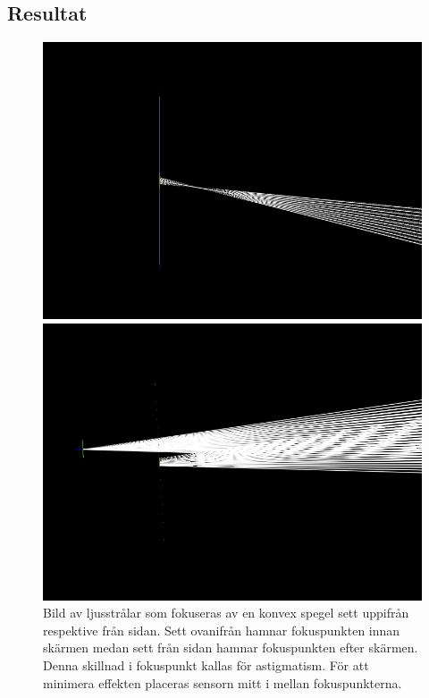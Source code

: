 \documentclass[a4paper]{article}
\begin{document}
\subsection{Resultat}

\FloatBarrier

\begin{figure}[h]
	\centering
	\begin{minipage}[b]{0.4\textwidth}
		\includegraphics[width=\textwidth]{Data/FRED/FRED1.jpg}
	\end{minipage}
	\hspace{10pt}
	\begin{minipage}[b]{0.4\textwidth}
		\includegraphics[width=\textwidth]{Data/FRED/FRED2.jpg}
	\end{minipage}
	\caption{Bild av ljusstrålar som fokuseras av en konvex spegel sett uppifrån respektive från sidan. Sett ovanifrån hamnar fokuspunkten innan skärmen medan sett från sidan hamnar fokuspunkten efter skärmen. Denna skillnad i fokuspunkt kallas för astigmatism. För att minimera effekten placeras sensorn mitt i mellan fokuspunkterna.}
	\label{fig:astigmBoth}
\end{figure}
\end{document}
